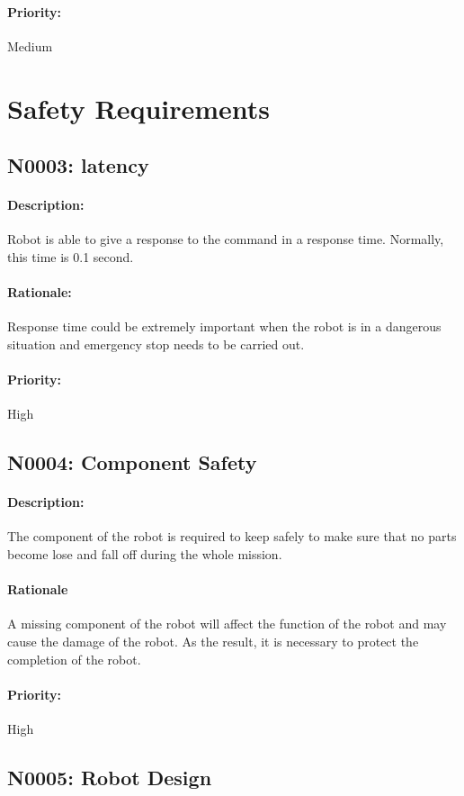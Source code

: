 \documentclass[11pt, a4paper]{report}
\begin{document}
\paragraph{Priority:}
Medium

\section{Safety Requirements}

\subsection{N0003: latency}
\paragraph{Description:}
Robot is able to give a response to the command in a response time. Normally, this time is 0.1 second.
\paragraph{Rationale:}
Response time could be extremely important when the robot is in a dangerous situation and emergency stop needs to be carried out.
\paragraph{Priority:}
High

\subsection{N0004: Component Safety}
\paragraph{Description:}
The component of the robot is required to keep safely to make sure that no parts become lose and fall off during the whole mission. 
\paragraph{Rationale}    
A missing component of the robot will affect the function of the robot and may cause the damage of the robot. As the result, it is necessary to protect the completion of the robot.
\paragraph{Priority:}
High
\subsection{N0005: Robot Design}
\end{document}
